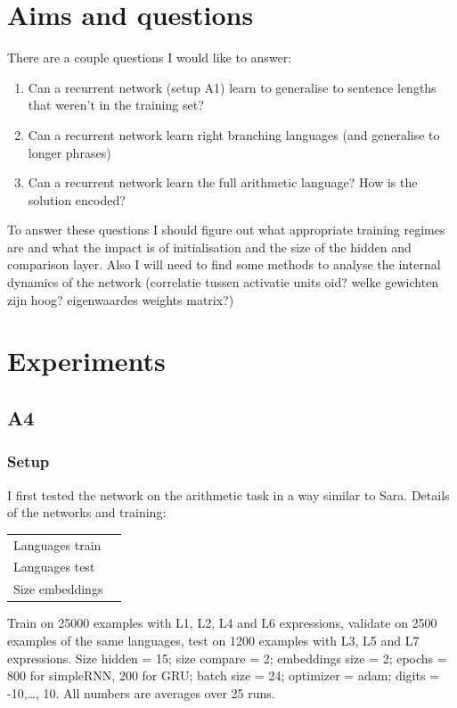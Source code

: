 \documentclass{article}
\begin{document}
\section{Aims and questions}

There are a couple questions I would like to answer:\begin{enumerate}
\item Can a recurrent network (setup A1) learn to generalise to sentence lengths that weren't in the training set?
\item Can a recurrent network learn right branching languages (and generalise to longer phrases)
\item Can a recurrent network learn the full arithmetic language? How is the solution encoded?
\end{enumerate}

To answer these questions I should figure out what appropriate training regimes are and what the impact is of initialisation and the size of the hidden and comparison layer. Also I will need to find some methods to analyse the internal dynamics of the network (correlatie tussen activatie units oid? welke gewichten zijn hoog? eigenwaardes weights matrix?)

\section{Experiments}

\subsection{A4}

\subsubsection{Setup}

I first tested the network on the arithmetic task in a way similar to Sara. Details of the networks and training:

\begin{tabular}{ll}
    Languages train &\\
    Languages test &\\
    Size embeddings & \\
\end{tabular}


Train on 25000 examples with L1, L2, L4 and L6 expressions, validate on 2500 examples of the same languages, test on 1200 examples with L3, L5 and L7 expressions. Size hidden = 15; size compare = 2; embeddings size = 2; epochs = 800 for simpleRNN, 200 for GRU; batch size = 24; optimizer = adam; digits = -10,\dots, 10. All numbers are averages over 25 runs.\\
\end{document}
